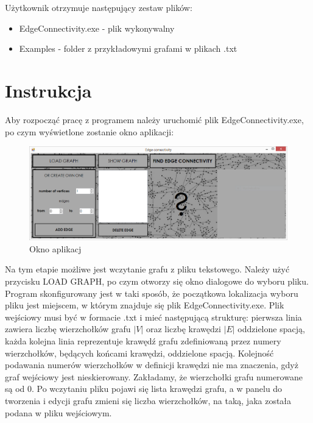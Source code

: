 \documentclass{article}
\begin{document}
Użytkownik otrzymuje następujący zestaw plików:

\begin{itemize}
    \item EdgeConnectivity.exe - plik wykonywalny
    \item Examples - folder z przykładowymi grafami w plikach .txt
\end{itemize}



\section{Instrukcja}

Aby rozpocząć pracę z programem należy uruchomić plik EdgeConnectivity.exe, po czym wyświetlone zostanie okno aplikacji:
 
\begin{figure}[h]
\centering
\includegraphics[scale=0.4]{01}
\caption{Okno aplikacj}
\end{figure}


Na tym etapie możliwe jest wczytanie grafu z pliku tekstowego. Należy użyć przycisku LOAD GRAPH, po czym otworzy się okno dialogowe do wyboru pliku. Program skonfigurowany jest w taki sposób, że początkowa lokalizacja wyboru pliku jest miejscem, w którym znajduje się plik EdgeConnectivity.exe. Plik wejściowy musi być w formacie .txt i mieć następującą strukturę:  pierwsza linia zawiera liczbę wierzchołków grafu $|V|$ oraz liczbę krawędzi $|E|$ oddzielone spacją, każda kolejna linia reprezentuje krawędź grafu zdeﬁniowaną przez numery wierzchołków, będących końcami krawędzi, oddzielone spacją. Kolejność podawania numerów wierzchołków w deﬁnicji krawędzi nie ma znaczenia, gdyż graf wejściowy jest nieskierowany. Zakładamy, że wierzchołki grafu numerowane są od 0.
Po wczytaniu pliku pojawi się lista krawędzi grafu, a w panelu do tworzenia i edycji grafu zmieni się liczba wierzchołków, na taką, jaka została podana w pliku wejściowym.
 
\end{document}

